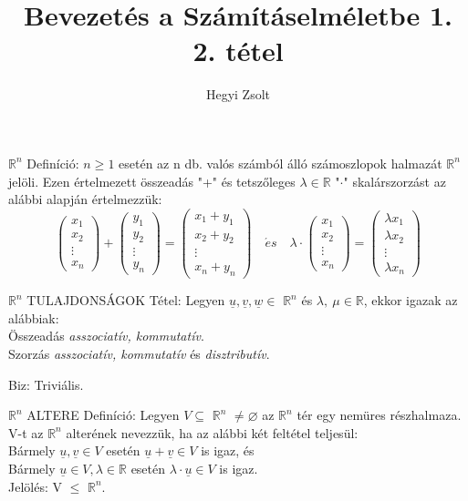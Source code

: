 \documentclass[]{article}
\title{Bevezetés a Számításelméletbe 1.\\{\large 2. tétel}}
\author{Hegyi Zsolt}
\newcommand{\R}{\mathbb{R}}
\newcommand{\Rn}[1]{$\mathbb{R}^{#1}$}
\newcommand{\Und}[1]{\underline{#1}}
\begin{document}
\maketitle{}
\begin{shaded}
\Rn{n} Definíció: $n \geq 1$ esetén az n db. valós számból álló számoszlopok halmazát \Rn{n} jelöli. Ezen értelmezett összeadás "+" és tetszőleges $\lambda \in \R$ "$\cdot$" skalárszorzást az alábbi alapján értelmezzük:
$$\begin{pmatrix}
x_1\\x_2\\\vdots\\x_n
\end{pmatrix} + \begin{pmatrix}
y_1\\y_2\\\vdots\\y_n
\end{pmatrix} = \begin{pmatrix}
x_1+y_1\\x_2+y_2\\\vdots\\x_n+y_n
\end{pmatrix}\quad \acute{e}s\quad \lambda\cdot \begin{pmatrix}
x_1\\x_2\\\vdots\\x_n
\end{pmatrix} = \begin{pmatrix}
\lambda x_1\\\lambda x_2\\\vdots\\\lambda x_n
\end{pmatrix}
$$
\end{shaded}
\begin{framed}
\Rn{n} TULAJDONSÁGOK Tétel: Legyen $\Und{u}, \Und{v}, \Und{w} \in$ \Rn{n} és $\lambda,\:\mu\in\R$, ekkor igazak az alábbiak:\\
Összeadás \textit{asszociatív, kommutatív}.\\
Szorzás \textit{asszociatív, kommutatív} és \textit{disztributív}.
\end{framed}
\begin{leftbar}
Biz: Triviális.
\end{leftbar}
\begin{shaded}
\Rn{n} ALTERE Definíció: Legyen $V \subseteq$ \Rn{n} $\neq \varnothing$ az \Rn{n} tér egy nemüres részhalmaza. V-t az \Rn{n} alterének nevezzük, ha az alábbi két feltétel teljesül:\\
Bármely $\Und{u},\Und{v} \in V$ esetén $\Und{u}+\Und{v} \in V$ is igaz, és\\
Bármely $\Und{u} \in V, \lambda \in \R$ esetén $\lambda\cdot\Und{u} \in V$ is igaz.\\
Jelölés: V $\leq$ \Rn{n}.
\end{shaded}
\end{document}
